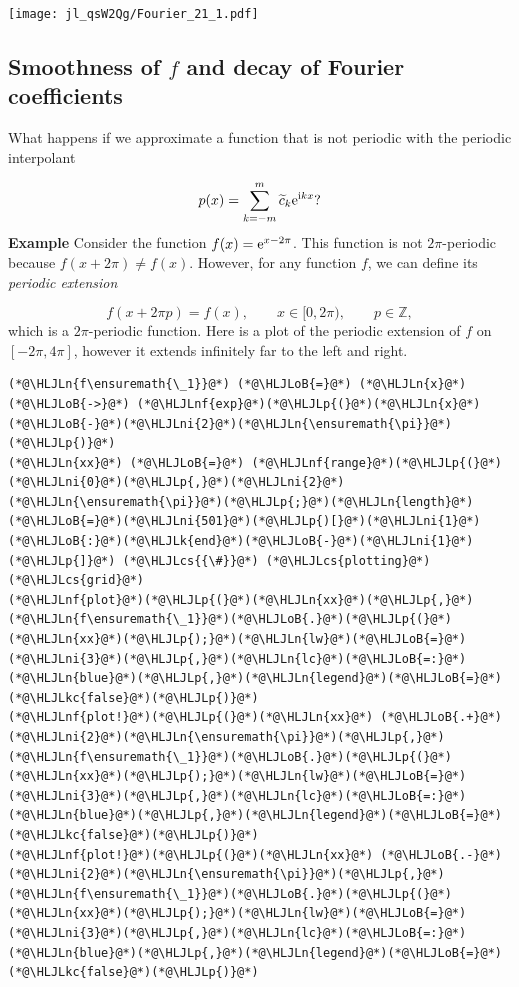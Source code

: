 \documentclass[12pt,landscape]{article}
\newcommand{\HLJLk}[1]{\textcolor[RGB]{148,91,176}{\textbf{#1}}}
\newcommand{\HLJLkc}[1]{\textcolor[RGB]{59,151,46}{\textit{#1}}}
\newcommand{\HLJLn}[1]{#1}
\newcommand{\HLJLnf}[1]{\textcolor[RGB]{66,102,213}{#1}}
\newcommand{\HLJLni}[1]{\textcolor[RGB]{59,151,46}{#1}}
\newcommand{\HLJLoB}[1]{\textcolor[RGB]{102,102,102}{\textbf{#1}}}
\newcommand{\HLJLp}[1]{#1}
\newcommand{\HLJLcs}[1]{\textcolor[RGB]{153,153,119}{\textit{#1}}}
\begin{document}
{\texttt{[image: jl\_qsW2Qg/Fourier\_21\_1.pdf]}

\subsection{Smoothness of $f$ and decay of Fourier coefficients}
What happens if we approximate a function that is not periodic with the periodic interpolant

\[
p(x) = \sum_{k=-m}^{m}\widetilde{c}_k{\rm e}^{{\rm i}kx}?
\]
\textbf{Example} Consider the function $f(x) = {\rm e}^{x-2\pi}$. This function is not  $2\pi$-periodic because $f(x + 2\pi) \neq f(x)$. However, for any function $f$, we can define its \emph{periodic extension}

\[
f(x + 2\pi p) = f(x), \qquad x \in [0, 2\pi), \qquad p \in \mathbb{Z},
\]
which is a $2\pi$-periodic function.  Here is a plot of the periodic extension of $f$ on $[-2\pi, 4\pi]$, however it extends infinitely far to the left and right.


\begin{lstlisting}
(*@\HLJLn{f\ensuremath{\_1}}@*) (*@\HLJLoB{=}@*) (*@\HLJLn{x}@*) (*@\HLJLoB{->}@*) (*@\HLJLnf{exp}@*)(*@\HLJLp{(}@*)(*@\HLJLn{x}@*)(*@\HLJLoB{-}@*)(*@\HLJLni{2}@*)(*@\HLJLn{\ensuremath{\pi}}@*)(*@\HLJLp{)}@*)
(*@\HLJLn{xx}@*) (*@\HLJLoB{=}@*) (*@\HLJLnf{range}@*)(*@\HLJLp{(}@*)(*@\HLJLni{0}@*)(*@\HLJLp{,}@*)(*@\HLJLni{2}@*)(*@\HLJLn{\ensuremath{\pi}}@*)(*@\HLJLp{;}@*)(*@\HLJLn{length}@*)(*@\HLJLoB{=}@*)(*@\HLJLni{501}@*)(*@\HLJLp{)[}@*)(*@\HLJLni{1}@*)(*@\HLJLoB{:}@*)(*@\HLJLk{end}@*)(*@\HLJLoB{-}@*)(*@\HLJLni{1}@*)(*@\HLJLp{]}@*) (*@\HLJLcs{{\#}}@*) (*@\HLJLcs{plotting}@*) (*@\HLJLcs{grid}@*)
(*@\HLJLnf{plot}@*)(*@\HLJLp{(}@*)(*@\HLJLn{xx}@*)(*@\HLJLp{,}@*)(*@\HLJLn{f\ensuremath{\_1}}@*)(*@\HLJLoB{.}@*)(*@\HLJLp{(}@*)(*@\HLJLn{xx}@*)(*@\HLJLp{);}@*)(*@\HLJLn{lw}@*)(*@\HLJLoB{=}@*)(*@\HLJLni{3}@*)(*@\HLJLp{,}@*)(*@\HLJLn{lc}@*)(*@\HLJLoB{=:}@*)(*@\HLJLn{blue}@*)(*@\HLJLp{,}@*)(*@\HLJLn{legend}@*)(*@\HLJLoB{=}@*)(*@\HLJLkc{false}@*)(*@\HLJLp{)}@*)
(*@\HLJLnf{plot!}@*)(*@\HLJLp{(}@*)(*@\HLJLn{xx}@*) (*@\HLJLoB{.+}@*) (*@\HLJLni{2}@*)(*@\HLJLn{\ensuremath{\pi}}@*)(*@\HLJLp{,}@*)(*@\HLJLn{f\ensuremath{\_1}}@*)(*@\HLJLoB{.}@*)(*@\HLJLp{(}@*)(*@\HLJLn{xx}@*)(*@\HLJLp{);}@*)(*@\HLJLn{lw}@*)(*@\HLJLoB{=}@*)(*@\HLJLni{3}@*)(*@\HLJLp{,}@*)(*@\HLJLn{lc}@*)(*@\HLJLoB{=:}@*)(*@\HLJLn{blue}@*)(*@\HLJLp{,}@*)(*@\HLJLn{legend}@*)(*@\HLJLoB{=}@*)(*@\HLJLkc{false}@*)(*@\HLJLp{)}@*)
(*@\HLJLnf{plot!}@*)(*@\HLJLp{(}@*)(*@\HLJLn{xx}@*) (*@\HLJLoB{.-}@*) (*@\HLJLni{2}@*)(*@\HLJLn{\ensuremath{\pi}}@*)(*@\HLJLp{,}@*)(*@\HLJLn{f\ensuremath{\_1}}@*)(*@\HLJLoB{.}@*)(*@\HLJLp{(}@*)(*@\HLJLn{xx}@*)(*@\HLJLp{);}@*)(*@\HLJLn{lw}@*)(*@\HLJLoB{=}@*)(*@\HLJLni{3}@*)(*@\HLJLp{,}@*)(*@\HLJLn{lc}@*)(*@\HLJLoB{=:}@*)(*@\HLJLn{blue}@*)(*@\HLJLp{,}@*)(*@\HLJLn{legend}@*)(*@\HLJLoB{=}@*)(*@\HLJLkc{false}@*)(*@\HLJLp{)}@*)
\end{lstlisting}

}
\end{document}

